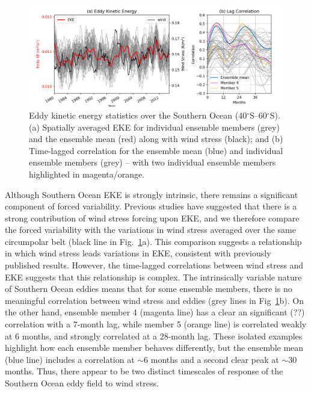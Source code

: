 \documentclass{agujournal2019-navid}
\begin{document}
\begin{figure}[t]
\begin{center}
\includegraphics[width=\hsize]{Figure2}
\caption{Eddy kinetic energy statistics over the Southern Ocean (40$^\circ$S--60$^\circ$S). (a) Spatially averaged EKE for individual ensemble members (grey) and the ensemble mean (red) along with wind stress (black); and (b) Time-lagged correlation for the ensemble mean (blue) and individual ensemble  members (grey) -- with two individual ensemble members highlighted in magenta/orange.}
\label{Fig:2}
\end{center}
\end{figure}

Although Southern Ocean EKE is strongly intrinsic, there remains a significant component of forced variability.
Previous studies have suggested that there is a strong contribution of wind stress forcing upon EKE, and we therefore compare the forced variability with the variations in wind stress averaged over the same circumpolar belt (black line in Fig.~\ref{Fig:2}a).
This comparison suggests a relationship in which wind stress leads variations in EKE, consistent with previously published results.
However, the time-lagged correlations between wind stress and EKE suggests that this relationship is complex. 
The intrinsically variable nature of Southern Ocean eddies means that for some ensemble members, there is no meaningful correlation between wind stress and eddies (grey lines in Fig~\ref{Fig:2}b).
On the other hand, ensemble member 4 (magenta line) has a clear an significant (??) correlation with a 7-month lag, while member 5 (orange line) is correlated weakly at 6 months, and strongly correlated at a 28-month lag.
These isolated examples highlight how each ensemble member behaves differently, but the ensemble mean (blue line) includes a correlation at $\sim$6 months and a second clear peak at $\sim$30 months.
Thus, there appear to be two distinct timescales of response of the Southern Ocean eddy field to wind stress. 
\end{document}
